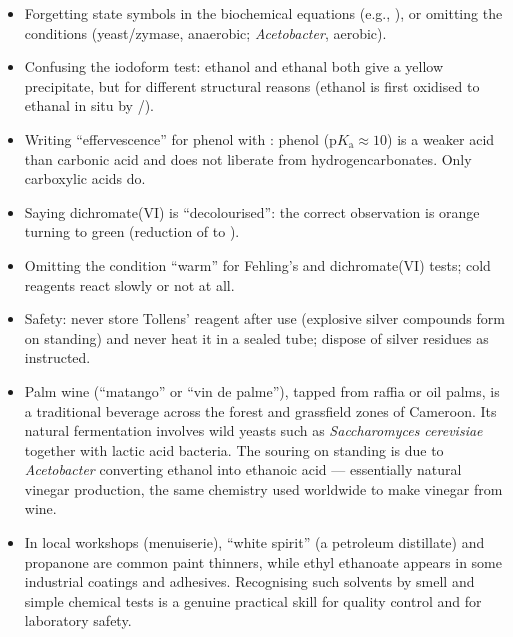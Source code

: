 \documentclass[11pt]{article}
\begin{document}
\begin{attention}
\begin{itemize}
\item Forgetting state symbols in the biochemical equations (e.g., ), or omitting the conditions (yeast/zymase, anaerobic; \emph{Acetobacter}, aerobic).
\item Confusing the iodoform test: ethanol and ethanal both give a yellow precipitate, but for different structural reasons (ethanol is first oxidised to ethanal in situ by /).
\item Writing ``effervescence'' for phenol with : phenol ($\mathrm{p}K_{\mathrm{a}} \approx 10$) is a weaker acid than carbonic acid and does not liberate  from hydrogencarbonates. Only carboxylic acids do.
\item Saying dichromate(VI) is ``decolourised'': the correct observation is orange turning to green (reduction of  to ).
\item Omitting the condition ``warm'' for Fehling's and dichromate(VI) tests; cold reagents react slowly or not at all.
\item Safety: never store Tollens' reagent after use (explosive silver compounds form on standing) and never heat it in a sealed tube; dispose of silver residues as instructed.
\end{itemize}
\end{attention}

\begin{savaistu}
\begin{itemize}
\item Palm wine (``matango'' or ``vin de palme''), tapped from raffia or oil palms, is a traditional beverage across the forest and grassfield zones of Cameroon. Its natural fermentation involves wild yeasts such as \emph{Saccharomyces cerevisiae} together with lactic acid bacteria. The souring on standing is due to \emph{Acetobacter} converting ethanol into ethanoic acid --- essentially natural vinegar production, the same chemistry used worldwide to make vinegar from wine.
\item In local workshops (menuiserie), ``white spirit'' (a petroleum distillate) and propanone are common paint thinners, while ethyl ethanoate appears in some industrial coatings and adhesives. Recognising such solvents by smell and simple chemical tests is a genuine practical skill for quality control and for laboratory safety.
\end{itemize}
\end{savaistu}
\end{document}
